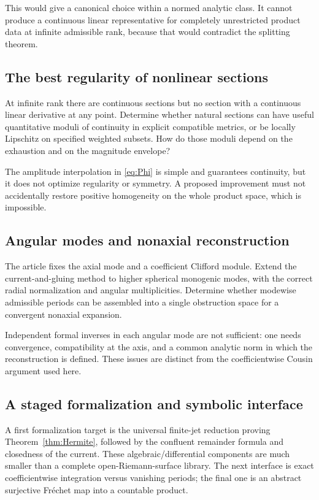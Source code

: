 \documentclass[11pt,a4paper]{article}
\numberwithin{equation}{section}
\theoremstyle{definition}
\theoremstyle{remark}
\begin{document}
This would give a canonical choice within a normed analytic class. It cannot
produce a continuous linear representative for completely unrestricted
product data at infinite admissible rank, because that would contradict the
splitting theorem.

\subsection{The best regularity of nonlinear sections}

At infinite rank there are continuous sections but no section with a
continuous linear derivative at any point. Determine whether natural sections
can have useful quantitative moduli of continuity in explicit compatible
metrics, or be locally Lipschitz on specified weighted subsets. How do those
moduli depend on the exhaustion and on the magnitude envelope?

The amplitude interpolation in \eqref{eq:Phi} is simple and guarantees
continuity, but it does not optimize regularity or symmetry. A proposed
improvement must not accidentally restore positive homogeneity on the whole
product space, which is impossible.

\subsection{Angular modes and nonaxial reconstruction}

The article fixes the axial mode and a coefficient Clifford module. Extend
the current-and-gluing method to higher spherical monogenic modes, with the
correct radial normalization and angular multiplicities. Determine whether
modewise admissible periods can be assembled into a single obstruction
space for a convergent nonaxial expansion.

Independent formal inverses in each angular mode are not sufficient: one
needs convergence, compatibility at the axis, and a common analytic norm in
which the reconstruction is defined. These issues are distinct from the
coefficientwise Cousin argument used here.

\subsection{A staged formalization and symbolic interface}

A first formalization target is the universal finite-jet reduction proving
Theorem~\ref{thm:Hermite}, followed by the confluent remainder formula and
closedness of the current. These algebraic/differential components are much
smaller than a complete open-Riemann-surface library. The next interface is
exact coefficientwise integration versus vanishing periods; the final one is
an abstract surjective Fr\'echet map into a countable product.
\end{document}

